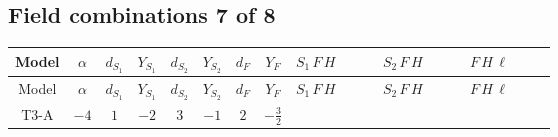 \documentclass[8pt]{article}
\begin{document}
\begin{landscape}
\subsection*{Field combinations 7 of 8}
\begin{longtable}{@{}cccccccc >{\raggedright\arraybackslash}p{0.21\linewidth} >{\raggedright\arraybackslash}p{0.21\linewidth} >{\raggedright\arraybackslash}p{0.21\linewidth}@{}}
\toprule
Model & $\alpha$ & $d_{S_1}$ & $Y_{S_1}$ & $d_{S_2}$ & $Y_{S_2}$ & $d_F$ & $Y_F$ & $S_1\,F\,H$ & $S_2\,F\,H$ & $F\,H\,\ell$ \\
\midrule
\endfirsthead
\toprule
Model & $\alpha$ & $d_{S_1}$ & $Y_{S_1}$ & $d_{S_2}$ & $Y_{S_2}$ & $d_F$ & $Y_F$ & $S_1\,F\,H$ & $S_2\,F\,H$ & $F\,H\,\ell$ \\
\midrule
\endhead
T3-A & $-4$ & $1$ & $-2$ & $3$ & $-1$ & $2$ & $-\frac{3}{2}$ & \scriptsize\adjustbox{max width=\linewidth}{$\begin{gathered} -2 \hbar  \log \left(\frac{\bar{\mu}^{2}}{M_F^2}\right) \overline{y_{1,i_1,r_1}} \overline{Y_{e,i_2,i_3}} H_{a_1} S_1 y_{1,i_2,r_1} Y_{e,i_1,i_3} H_{a_1}{}^{\dagger } S_1{}^{\dagger } \\ -2 \hbar  \log \left(\frac{\bar{\mu}^{2}}{M_F^2}\right) \overline{y_{1,i_1,r_1}} H_{a_2} S_1 y_{1,i_1,r_1} H_{a_1}{}^{\dagger } S_1{}^{\dagger } \mathcal{I}_{H1,a_1,a_2}{}^1 \lambda_{HS_1}^{(1)}^{(1)}\end{gathered}$} & \scriptsize\adjustbox{max width=\linewidth}{$\begin{gathered} -\frac{2 \hbar  \log \left(\frac{\bar{\mu}^{2}}{M_F^2}\right) \overline{y_{2,i_1,r_1}} \overline{Y_{e,i_2,i_3}} H_{a_1} S_{2,j_1} y_{2,i_2,r_1} Y_{e,i_1,i_3} H_{a_1}{}^{\dagger } S_{2,j_1}{}^{\dagger }}{\sqrt{3}} \\ -2 i \sqrt{\frac{2}{3}} \hbar  \log \left(\frac{\bar{\mu}^{2}}{M_F^2}\right) \overline{y_{2,i_1,r_1}} \overline{Y_{e,i_2,i_3}} H_{a_2} S_{2,j_2} y_{2,i_2,r_1} Y_{e,i_1,i_3} H_{a_1}{}^{\dagger } S_{2,j_1}{}^{\dagger } \mathcal{I}_{H2,a_1,a_2,j_1,j_2}{}^1 \\ -\frac{2 \hbar  \log \left(\frac{\bar{\mu}^{2}}{M_F^2}\right) \overline{y_{2,i_1,r_1}} H_{a_2} S_{2,j_2} y_{2,i_1,r_1} H_{a_1}{}^{\dagger } S_{2,j_1}{}^{\dagger } \mathcal{I}_{H2,a_1,a_2,j_1,j_2}{}^2 \lambda_{HS_2}^{(1)}^{(2)}}{\sqrt{3}}\end{gathered}$} & \scriptsize\adjustbox{max width=\linewidth}{$\begin{gathered} +\frac{2 \hbar  \log \left(\frac{\bar{\mu}^{2}}{M_F^2}\right) \overline{y_{1,i_1,r_1}} \overline{y_{2,i_2,r_1}} L_{a_4,i_2}{}^T\, C\, P_L\, L_{a_2,i_1} H_{a_1} H_{a_3} \lambda_5 \epsilon_{a_1,a_2} \epsilon_{a_3,a_4}}{\sqrt{3} M_F} \\ +\frac{2 \hbar  \log \left(\frac{\bar{\mu}^{2}}{M_F^2}\right) \overline{\lambda_5} \overline{L_{a_3,i_1}}\, C\, P_R\, \overline{L_{a_4,i_2}}{}^T y_{1,i_1,r_1} y_{2,i_2,r_1} \epsilon_{a_1,a_3} \epsilon_{a_2,a_4} H_{a_1}{}^{\dagger } H_{a_2}{}^{\dagger }}{\sqrt{3} M_F}\end{gathered}$} \\
\midrule
\bottomrule
\end{longtable}
\clearpage

\end{landscape}
\end{document}
